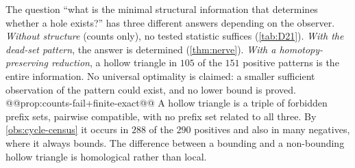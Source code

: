 The question ``what is the minimal structural information that determines whether a hole exists?'' has three different answers depending on the observer. \emph{Without structure} (counts only), no tested statistic suffices (\cref{tab:D21}). \emph{With the dead-set pattern}, the answer is determined (\cref{thm:nerve}). \emph{With a homotopy-preserving reduction}, a hollow triangle in $105$ of the $151$ positive patterns is the entire information. No universal optimality is claimed: a smaller sufficient observation of the pattern could exist, and no lower bound is proved.
@@prop:counts-fail+finite-exact@@
A hollow triangle is a triple of forbidden prefix sets, pairwise compatible, with no prefix set related to all three. By \cref{obs:cycle-census} it occurs in $288$ of the $290$ positives and also in many negatives, where it always bounds. The difference between a bounding and a non-bounding hollow triangle is homological rather than local.
